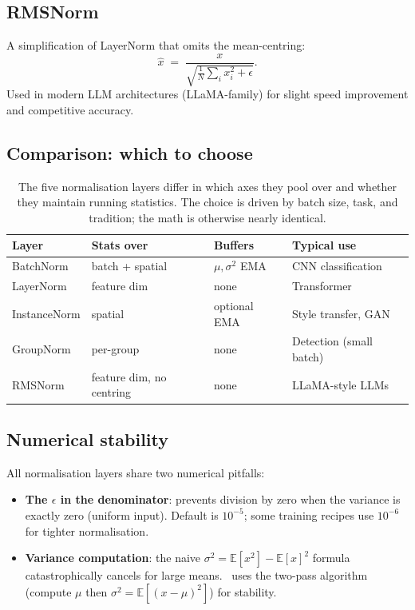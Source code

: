\subsection{RMSNorm}
\label{ssec:linear_conv_norm:rmsnorm}

A simplification of LayerNorm \cite{zhang_rmsnorm_2019} that
omits the mean-centring:
\[
\hat x \;=\; \frac{x}{\sqrt{\frac{1}{N}\sum_i x_i^2 + \epsilon}}.
\]
Used in modern LLM architectures (LLaMA-family) for slight speed
improvement and competitive accuracy.

\subsection{Comparison: which to choose}
\label{ssec:linear_conv_norm:norm_compare}

\begin{table}[t]
\centering
\small
\begin{tabular}{llll}
\toprule
Layer & Stats over & Buffers & Typical use \\
\midrule
BatchNorm  & batch + spatial & $\mu, \sigma^2$ EMA & CNN classification \\
LayerNorm  & feature dim     & none                & Transformer \\
InstanceNorm & spatial       & optional EMA        & Style transfer, GAN \\
GroupNorm  & per-group       & none                & Detection (small batch) \\
RMSNorm    & feature dim, no centring & none      & LLaMA-style LLMs \\
\bottomrule
\end{tabular}
\caption[Normalisation layer comparison.]{The five
normalisation layers differ in which axes they pool over and
whether they maintain running statistics. The choice is driven
by batch size, task, and tradition; the math is otherwise
nearly identical.}
\label{tab:linear_conv_norm:norm_compare}
\end{table}

\subsection{Numerical stability}
\label{ssec:linear_conv_norm:norm_stability}

All normalisation layers share two numerical pitfalls:

\begin{itemize}
  \item \textbf{The $\epsilon$ in the denominator}: prevents
    division by zero when the variance is exactly zero
    (uniform input). Default is $10^{-5}$; some training
    recipes use $10^{-6}$ for tighter normalisation.
  \item \textbf{Variance computation}: the naive
    $\sigma^2 = \mathbb{E}[x^2] - \mathbb{E}[x]^2$ formula
    catastrophically cancels for large means. \Lucid\ uses
    the two-pass algorithm (compute $\mu$ then
    $\sigma^2 = \mathbb{E}[(x - \mu)^2]$) for stability.
\end{itemize}

